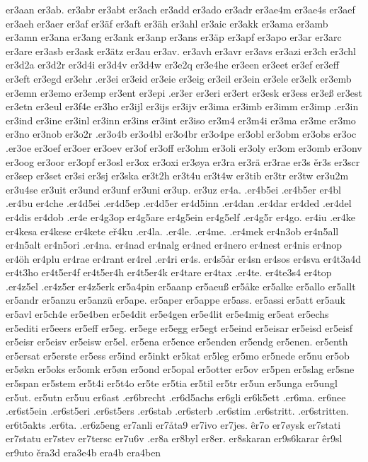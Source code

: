 er3aan
er3ab.
er3abr
er3abt
er3ach
er3add
er3ado
er3adr
er3ae4m
er3ae4s
er3aef
er3aeh
er3aer
er3af
er3äf
er3aft
er3äh
er3ahl
er3aic
er3akk
er3ama
er3amb
er3amn
er3ana
er3ang
er3ank
er3anp
er3ans
er3äp
er3apf
er3apo
er3ar
er3arc
er3are
er3asb
er3ask
er3ätz
er3au
er3av.
er3avh
er3avr
er3avs
er3azi
er3ch
er3chl
er3d2a
er3d2r
er3d4i
er3d4v
er3d4w
er3e2q
er3e4he
er3een
er3eet
er3ef
er3eff
er3eft
er3egd
er3ehr
.er3ei
er3eid
er3eie
er3eig
er3eil
er3ein
er3ele
er3elk
er3emb
er3emn
er3emo
er3emp
er3ent
er3epi
.er3er
er3eri
er3ert
er3esk
er3ess
er3eß
er3est
er3etn
er3eul
er3f4e
er3ho
er3ijl
er3ijs
er3ijv
er3ima
er3imb
er3imm
er3imp
.er3in
er3ind
er3ine
er3inl
er3inn
er3ins
er3int
er3iso
er3m4
er3m4i
er3ma
er3me
er3mo
er3no
er3nob
er3o2r
.er3o4b
er3o4bl
er3o4br
er3o4pe
er3obl
er3obm
er3obs
er3oc
.er3oe
er3oef
er3oer
er3oev
er3of
er3off
er3ohm
er3oli
er3oly
er3om
er3omb
er3onv
er3oog
er3oor
er3opf
er3osl
er3ox
er3oxi
er3øya
er3ra
er3rä
er3rae
er3s
ěr3s
er3scr
er3sep
er3set
er3si
er3sj
er3ska
er3t2h
er3t4u
er3t4w
er3tib
er3tr
er3tw
er3u2m
er3u4se
er3uit
er3und
er3unf
er3uni
er3up.
er3uz
er4a.
.er4b5ei
.er4b5er
er4bl
.er4bu
er4che
.er4d5ei
.er4d5ep
.er4d5er
er4d5inn
.er4dan
.er4dar
er4ded
.er4del
er4dis
er4dob
.er4e
er4g3op
er4g5are
er4g5ein
er4g5elf
.er4g5r
er4go.
er4iu
.er4ke
er4kesa
er4kese
er4kete
eř4ku
.er4la.
.er4le.
.er4me.
.er4mek
er4n3ob
er4n5all
er4n5alt
er4n5ori
.er4na.
er4nad
er4nalg
er4ned
er4nero
er4nest
er4nis
er4nop
er4öh
er4plu
er4rae
er4rant
er4rel
.er4ri
er4s.
er4s5år
er4sn
er4sos
er4sva
er4t3a4d
er4t3ho
er4t5er4f
er4t5er4h
er4t5er4k
er4tare
er4tax
.er4te.
er4te3s4
er4top
.er4z5el
.er4z5er
er4z5erk
er5a4pin
er5aanp
er5aeuß
er5åke
er5alke
er5allo
er5allt
er5andr
er5anzu
er5anzü
er5ape.
er5aper
er5appe
er5ass.
er5assi
er5att
er5auk
er5avl
er5ch4e
er5e4ben
er5e4dit
er5e4gen
er5e4lit
er5e4mig
er5eat
er5echs
er5editi
er5eers
er5eff
er5eg.
er5ege
er5egg
er5egt
er5eind
er5eisar
er5eisd
er5eisf
er5eisr
er5eisv
er5eisw
er5el.
er5ena
er5ence
er5enden
er5endg
er5enen.
er5enth
er5ersat
er5erste
er5ess
er5ind
er5inkt
er5kat
er5leg
er5mo
er5nede
er5nu
er5ob
er5økn
er5oks
er5omk
er5øn
er5ond
er5opal
er5otter
er5ov
er5pen
er5slag
er5sne
er5span
er5stem
er5t4i
er5t4o
er5te
er5tia
er5til
er5tr
er5un
er5unga
er5ungl
er5ut.
er5utn
er5uu
er6ast
.er6brecht
.er6d5achs
er6gli
er6k5ett
.er6ma.
er6nee
.er6st5ein
.er6st5eri
.er6st5ers
.er6stab
.er6sterb
.er6stim
.er6stritt.
.er6stritten.
er6t5akts
.er6ta.
.er6z5eng
er7anli
er7åta9
er7ivo
er7jes.
êr7o
er7øysk
er7stati
er7statu
er7stev
er7tersc
er7u6v
.er8a
er8byl
er8er.
er8skaran
er9s6karar
êr9sl
er9uto
ěra3d
era3e4b
era4b
era4ben
